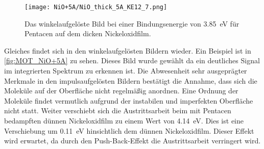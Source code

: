             \begin{figure}
                \centering
                \texttt{[image: NiO+5A/NiO\_thick\_5A\_KE12\_7.png]}
                \caption{Das winkelaufgelöste Bild bei einer Bindungsenergie von \SI{3.85}{\electronvolt} für Pentacen auf dem dicken Nickeloxidfilm.} %
                \label{fig:MOT_NiO+5A}
            \end{figure}
            Gleiches findet sich in den winkelaufgelösten Bildern wieder.
            Ein Beispiel ist in \autoref{fig:MOT_NiO+5A} zu sehen.
            Dieses Bild wurde gewählt da ein deutliches Signal im integrierten Spektrum zu erkennen ist.
            Die Abwesenheit sehr ausgeprägter Merkmale in den impulsaufgelösten Bildern bestätigt die Annahme, dass sich die Moleküle auf der Oberfläche nicht regelmäßig anordnen.
            Eine Ordnung der Moleküle findet vermutlich aufgrund der instabilen und imperfekten Oberfläche nicht statt.
            Weiter verschiebt sich die Austrittsarbeit beim mit Pentacen bedampften dünnen Nickeloxidfilm zu einem Wert von \SI{4.14}{\electronvolt}.
            Dies ist eine Verschiebung um \SI{0.11}{\electronvolt} hinsichtlich dem dünnen Nickeloxidfilm.
            Dieser Effekt wird erwartet, da durch den Push-Back-Effekt die Austrittsarbeit verringert wird.


